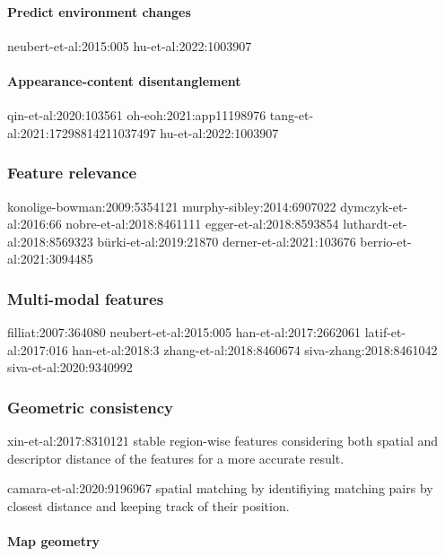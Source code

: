 \paragraph{Predict environment changes}

neubert-et-al:2015:005
hu-et-al:2022:1003907


\paragraph{Appearance-content disentanglement}

qin-et-al:2020:103561
oh-eoh:2021:app11198976
tang-et-al:2021:17298814211037497
hu-et-al:2022:1003907



\subsubsection{Feature relevance}

konolige-bowman:2009:5354121
murphy-sibley:2014:6907022
dymczyk-et-al:2016:66
nobre-et-al:2018:8461111
egger-et-al:2018:8593854
luthardt-et-al:2018:8569323
bürki-et-al:2019:21870
derner-et-al:2021:103676
berrio-et-al:2021:3094485



\subsubsection{Multi-modal features}

filliat:2007:364080
neubert-et-al:2015:005
han-et-al:2017:2662061
latif-et-al:2017:016
han-et-al:2018:3
zhang-et-al:2018:8460674
siva-zhang:2018:8461042
siva-et-al:2020:9340992



\subsubsection{Geometric consistency}

xin-et-al:2017:8310121
stable region-wise features considering both spatial and descriptor distance of the features for a more accurate result.

camara-et-al:2020:9196967 spatial matching by identifiying matching pairs by closest distance and keeping track of their position.

\paragraph{Map geometry}

